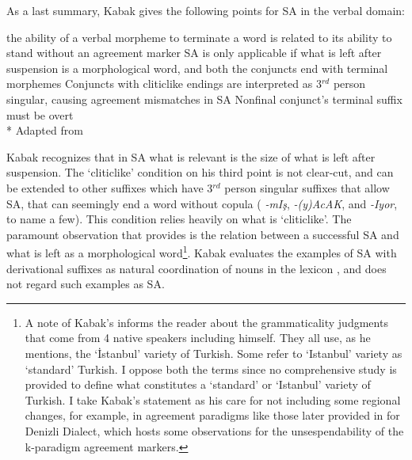 As a last summary, Kabak gives the following points for SA in the verbal domain:
\begin{exe}
\sn \begin{xlisti}
    \ex the ability of a verbal morpheme to terminate a word is related to its ability to stand without an agreement marker
    \ex SA is only applicable if what is left after suspension is a morphological word, and both the conjuncts end with terminal morphemes
    \ex Conjuncts with cliticlike endings are interpreted as 3$^{rd}$ person singular, causing agreement mismatches in SA
    \ex Nonfinal conjunct's terminal suffix must be overt\\*
    \hfill Adapted from \citet{kabak2007turkish}
    \end{xlisti}
\end{exe}

Kabak recognizes that in SA what is relevant is the size of what is left after suspension. The `cliticlike' condition on his third point is not clear-cut, and can be extended to other suffixes which have 3$^{rd}$ person singular suffixes that allow SA, that can seemingly end a word without copula ( \textit{-mIş}, \textit{-(y)AcAK}, and \textit{-Iyor}, to name a few). This condition relies heavily on what is `cliticlike'. The paramount observation that \citet{kabak2007turkish} provides is the relation between a successful SA and what is left as a morphological word\footnote{A note of Kabak's informs the reader about the grammaticality judgments that come from 4 native speakers including himself. They all use, as he mentions, the `İstanbul' variety of Turkish. Some refer to `Istanbul' variety as `standard' Turkish. I oppose both the terms since no comprehensive study is provided to define what constitutes a `standard' or `Istanbul' variety of Turkish. I take Kabak's statement as his care for not including some regional changes, for example, in agreement paradigms like those later provided in \citet{saug2013verbal} for Denizli Dialect, which hosts some observations for the unsespendability of the k-paradigm agreement markers.}. Kabak evaluates the examples of SA with derivational suffixes as natural coordination of nouns in the lexicon \citep{walchli2005co}, and does not regard such examples as SA.

